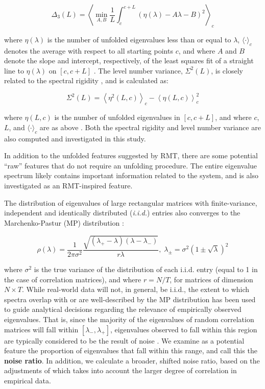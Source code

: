 \documentclass[NETN,manuscript]{stjour-new}
\begin{document}
\[
\Delta_3(L) = \left \langle \min_{A,B} \frac{1}{L} \int_c^{c+L} \left(  \eta(\lambda) -A \lambda - B \right)^2 \right \rangle_c
\]

where \(\eta(\lambda)\) is the number of unfolded eigenvalues less than or equal to \(\lambda\),
\(\langle \cdot \rangle_c\) denotes the average with respect to all starting points \(c\), and where
\(A\) and \(B\) denote the slope and intercept, respectively, of the least squares fit of a straight
line to \(\eta(\lambda)\) on \([c, c+L]\) \citep{guhrRandommatrixTheoriesQuantum1998a}. The level
number variance, \(\Sigma^2(L)\), is closely related to the spectral rigidity
\citep{mehtaRandomMatrices2004}, and is calculated as:

\[
\Sigma^2(L) = \left\langle \eta^2(L, c) \right\rangle_c - \left\langle \eta(L, c) \right\rangle^2_c
\]

where \(\eta(L, c)\) is the number of unfolded eigenvalues in \([c, c+ L]\), and where \(c\), \(L\),
and \(\langle \cdot \rangle_c\) are as above \citep{guhrRandommatrixTheoriesQuantum1998a}. Both the
spectral rigidity and level number variance are also computed and investigated in this study.

In addition to the unfolded features suggested by RMT, there are some potential ``raw'' features that
do not require an unfolding procedure. The entire eigenvalue spectrum likely contains important
information related to the system, and is also investigated as an RMT-inspired feature.

The distribution of eigenvalues of large rectangular matrices with finite-variance, independent and
identically distributed (\textit{i.i.d.}) entries also converges to the Marchenko-Pastur (MP)
distribution \citep{marcenkoDISTRIBUTIONEIGENVALUESSETS1967,yaoLargeSampleCovariance2015}:

\[
\rho(\lambda) =
\frac{1}{2\pi\sigma^2}
\frac{\sqrt{(\lambda_+ - \lambda)(\lambda - \lambda_-)}}{r\lambda}, \;
\lambda_{\pm} = \sigma^2\left(1 \pm \sqrt{\lambda}\right)^2
\]

where \(\sigma^2\) is the true variance of the distribution of each i.i.d. entry (equal to 1 in the
case of correlation matrices), and where \(r = N / T\), for matrices of dimension \(N \times T\).
While real-world data will not, in general, be i.i.d., the extent to which spectra overlap with or
are well-described by the MP distribution has been used to guide analytical decisions regarding the
relevance of empirically observed eigenvalues. That is, since the majority of the eigenvalues of
random correlation matrices will fall within \([\lambda_{-}, \lambda_{+}]\), eigenvalues observed to
fall within this region are typically considered to be the result of noise
\citep{veraartDenoisingDiffusionMRI2016,veraartDiffusionMRINoise2016,ulfarssonDimensionEstimationNoisy2008,macmahonCommunityDetectionCorrelation2015}.
We examine as a potential feature the proportion of eigenvalues that fall within this range, and
call this the \textbf{noise ratio}. In addition, we calculate a broader, shifted noise ratio, based on the
adjustments of \cite{almogUncoveringFunctionalSignature2019} which takes into account the larger
degree of correlation in empirical data.
\end{document}
